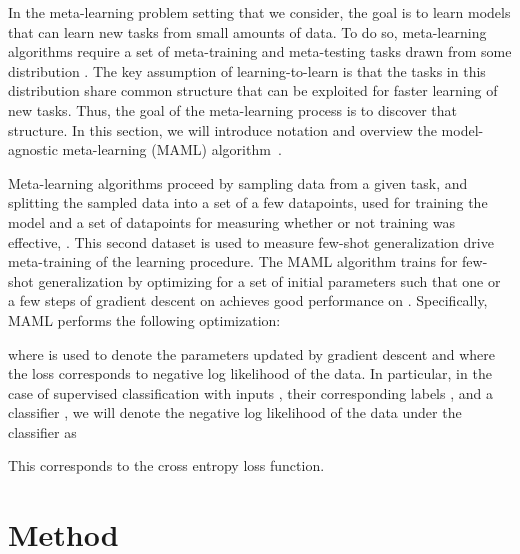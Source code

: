 \documentclass{article}
\begin{document}
In the meta-learning problem setting that we consider, the goal is to learn models that can learn new tasks from small amounts of data. To do so, meta-learning algorithms require a set
of meta-training and meta-testing tasks drawn from some distribution . The key assumption of learning-to-learn is that the tasks in this distribution share common structure that can be exploited for faster learning of new tasks. Thus, the goal of the meta-learning process is to discover that structure.
In this section, we will introduce notation and overview the model-agnostic meta-learning (MAML) algorithm~\cite{finn2017model}. 

Meta-learning algorithms proceed by sampling data from a given task, and splitting the sampled data into a set of a few datapoints,  used for training the model and a set of datapoints for measuring whether or not training was effective, . This second dataset is used to measure few-shot generalization drive meta-training of the learning procedure. The MAML algorithm trains for few-shot generalization by optimizing for a set of initial parameters  such that one or a few steps of gradient descent on  achieves good performance on . Specifically, MAML performs the following optimization:

where  is used to denote the parameters updated by gradient descent and where the loss corresponds to negative log likelihood of the data. In particular, in the case of supervised classification with inputs , their corresponding labels , and a classifier , we will denote the negative log likelihood of the data under the classifier as 

This corresponds to the cross entropy loss function.

 
\vspace{-0.3cm}
\section{Method}
\label{sec:method}
\vspace{-0.2cm}



\iffalse
\begingroup
\setlength{\columnsep}{0.1cm}\begin{wrapfigure}{R}{0.6\columnwidth}
    \vspace{-0.4cm}
    \texttt{[image: figures/promaml\_both\_v2.png]}
    \vspace{-0.4cm}
    \caption{\label{fig:promaml} .}
\end{wrapfigure}
\begingroup
\fi
\end{document}
